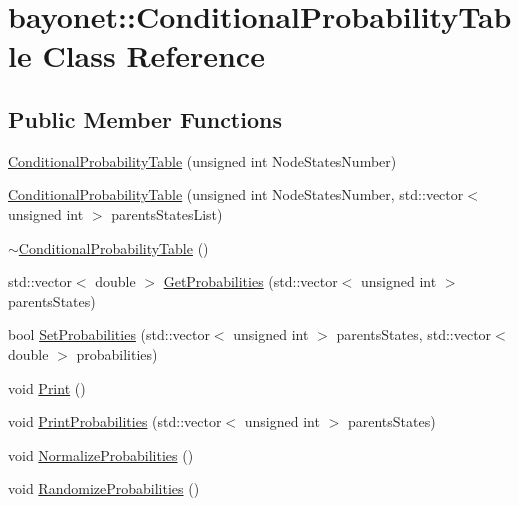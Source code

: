 \hypertarget{classbayonet_1_1_conditional_probability_table}{\section{bayonet\-:\-:Conditional\-Probability\-Table Class Reference}
\label{classbayonet_1_1_conditional_probability_table}
}
\subsection*{Public Member Functions}
\begin{DoxyCompactItemize}
\item 
\hyperlink{classbayonet_1_1_conditional_probability_table_a58abcca6946f80bfe3c86ccbbdeed31e}{Conditional\-Probability\-Table} (unsigned int Node\-States\-Number)
\item 
\hyperlink{classbayonet_1_1_conditional_probability_table_af83db269bcfc340658801d5e473ad5c8}{Conditional\-Probability\-Table} (unsigned int Node\-States\-Number, std\-::vector$<$ unsigned int $>$ parents\-States\-List)
\item 
\hyperlink{classbayonet_1_1_conditional_probability_table_a5fd07eba1d571bf8f8bac3014f2409b2}{$\sim$\-Conditional\-Probability\-Table} ()
\item 
std\-::vector$<$ double $>$ \hyperlink{classbayonet_1_1_conditional_probability_table_a7612e2c40e51eaf4d94109adb2bd269d}{Get\-Probabilities} (std\-::vector$<$ unsigned int $>$ parents\-States)
\item 
bool \hyperlink{classbayonet_1_1_conditional_probability_table_ac94cd225747e8f59c5497b860ff777c0}{Set\-Probabilities} (std\-::vector$<$ unsigned int $>$ parents\-States, std\-::vector$<$ double $>$ probabilities)
\item 
void \hyperlink{classbayonet_1_1_conditional_probability_table_a0815f7814cc5797629035f17f0cf26c2}{Print} ()
\item 
void \hyperlink{classbayonet_1_1_conditional_probability_table_a0ca5c1cbfeb5c86ef06161a810233b2a}{Print\-Probabilities} (std\-::vector$<$ unsigned int $>$ parents\-States)
\item 
void \hyperlink{classbayonet_1_1_conditional_probability_table_a600256d28edeef688ab4cdf38794acc3}{Normalize\-Probabilities} ()
\item 
void \hyperlink{classbayonet_1_1_conditional_probability_table_a224d882019f784a993c50043dca4cb5d}{Randomize\-Probabilities} ()
\item 

\end{DoxyCompactItemize}
